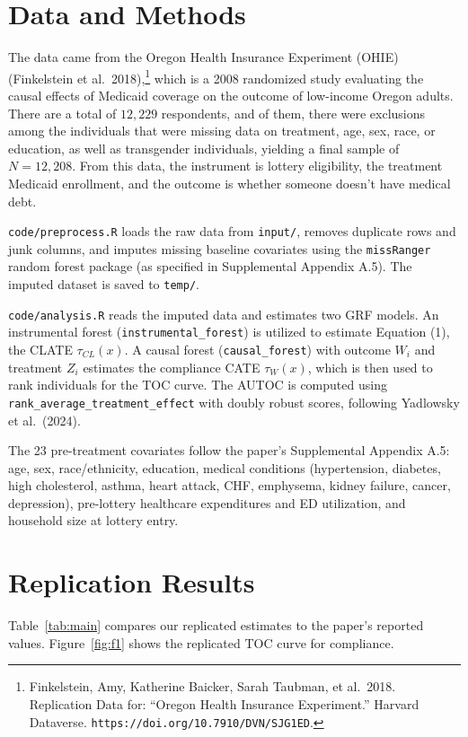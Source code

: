 \documentclass[12pt]{article}
\begin{document}
\section{Data and Methods}

The data came from the Oregon Health Insurance Experiment (OHIE) (Finkelstein et al.\ 2018),\footnote{Finkelstein, Amy, Katherine Baicker, Sarah Taubman, et al.\ 2018. Replication Data for: ``Oregon Health Insurance Experiment.'' Harvard Dataverse. \texttt{https://doi.org/10.7910/DVN/SJG1ED}.} which is a 2008 randomized study evaluating the causal effects of Medicaid coverage on the outcome of low-income Oregon adults. There are a total of $12{,}229$ respondents,
and of them, there were exclusions among the individuals that were missing data on treatment, age, sex, race, or education, as well as transgender individuals, yielding a final sample of $N = 12{,}208$. From this data, the instrument is
lottery eligibility, the treatment Medicaid enrollment, and the outcome is whether someone doesn't have medical debt.

\texttt{code/preprocess.R} loads the raw data from \texttt{input/}, removes
duplicate rows and junk columns, and imputes missing baseline covariates using
the \texttt{missRanger} random forest package (as specified in Supplemental
Appendix A.5). The imputed dataset is saved to \texttt{temp/}.

\texttt{code/analysis.R} reads the imputed data and estimates two GRF models.
An instrumental forest (\texttt{instrumental\_forest}) is utilized to estimate Equation (1),
the CLATE $\tau_{CL}(x)$. A causal forest (\texttt{causal\_forest}) with
outcome $W_i$ and treatment $Z_i$ estimates the compliance CATE $\tau_W(x)$,
which is then used to rank individuals for the TOC curve. The AUTOC is computed
using \texttt{rank\_average\_treatment\_effect} with doubly robust scores,
following Yadlowsky et al.\ (2024).

The 23 pre-treatment covariates follow the paper's Supplemental Appendix A.5:
age, sex, race/ethnicity, education, medical conditions (hypertension, diabetes,
high cholesterol, asthma, heart attack, CHF, emphysema, kidney failure, cancer,
depression), pre-lottery healthcare expenditures and ED utilization, and
household size at lottery entry.

\section{Replication Results}

Table~\ref{tab:main} compares our replicated estimates to the paper's reported
values. Figure~\ref{fig:f1} shows the replicated TOC curve for compliance.
\end{document}
